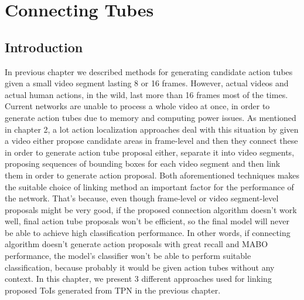 





% 

\chapter{Connecting Tubes}
\section{Introduction}
In previous chapter we described methods for generating candidate action tubes given a small video segment lasting 8 or 16 frames. However, actual videos
and actual human actions, in the  wild, last more than 16 frames most of the times. Current networks are unable to process a whole video at once, in order to generate action tubes
due to memory and computing power issues.  As mentioned in chapter 2, a lot action localization approaches deal with this situation by given a video either
propose candidate areas in frame-level and then they connect these in order to generate action tube proposal either, separate it into video segments,
proposing  sequences of bounding boxes for each video segment and then link them in order to generate action proposal. Both aforementioned techniques makes
the suitable choice of linking method an important factor for the performance of the network. That's because, even though frame-level or video segment-level proposals
might be very good, if the proposed connection algorithm doesn't work well, final action tube proposals won't be efficient, so the final model will never
be able to achieve high classification performance. In other words, if connecting algorithm doesn't generate action proposals with great recall and MABO performance,
the model's classifier won't be able to perform suitable classification, because probably it would be given action tubes without any context.
In this chapter, we present 3 different approaches used for linking proposed ToIs generated from TPN in the previous chapter.

